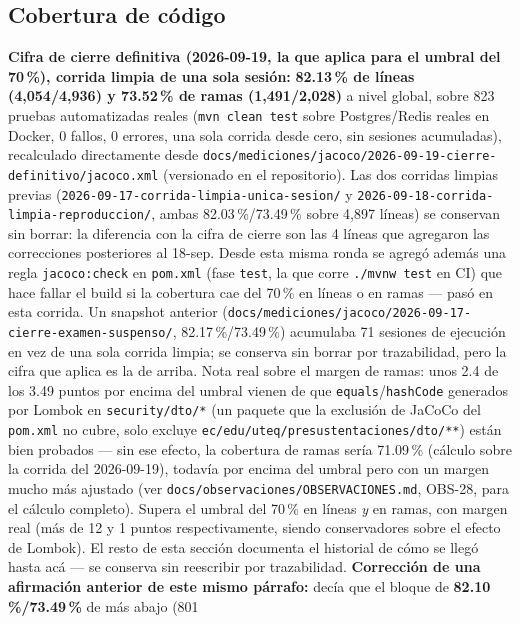 \subsection{Cobertura de código}

\textbf{Cifra de cierre definitiva (2026-09-19, la que aplica para el umbral del 70\,\%), corrida limpia
de una sola sesión:} \textbf{82.13\,\% de líneas (4,054/4,936) y 73.52\,\% de ramas (1,491/2,028)} a
nivel global, sobre 823 pruebas automatizadas reales (\texttt{mvn clean test} sobre Postgres/Redis reales
en Docker, 0 fallos, 0 errores, una sola corrida desde cero, sin sesiones acumuladas), recalculado
directamente desde
\texttt{docs/mediciones/jacoco/2026-09-19-cierre-definitivo/jacoco.xml} (versionado en el
repositorio). Las dos corridas limpias previas (\texttt{2026-09-17-corrida-limpia-unica-sesion/} y
\texttt{2026-09-18-corrida-limpia-reproduccion/}, ambas 82.03\,\%/73.49\,\% sobre 4,897 líneas) se
conservan sin borrar: la diferencia con la cifra de cierre son las 4 líneas que agregaron las
correcciones posteriores al 18-sep. Desde esta misma ronda se agregó además una regla \texttt{jacoco:check} en \texttt{pom.xml}
(fase \texttt{test}, la que corre \texttt{./mvnw test} en CI) que hace fallar el build si la cobertura
cae del 70\,\% en líneas o en ramas --- pasó en esta corrida. Un snapshot anterior
(\texttt{docs/mediciones/jacoco/2026-09-17-cierre-examen-suspenso/}, 82.17\,\%/73.49\,\%) acumulaba 71
sesiones de ejecución en vez de una sola corrida limpia; se conserva sin borrar por trazabilidad, pero la
cifra que aplica es la de arriba. Nota real sobre el margen de ramas: unos 2.4 de los 3.49 puntos por
encima del umbral vienen de que \texttt{equals}/\texttt{hashCode} generados por Lombok en
\texttt{security/dto/*} (un paquete que la exclusión de JaCoCo del \texttt{pom.xml} no cubre, solo
excluye \texttt{ec/edu/uteq/presustentaciones/dto/**}) están bien probados --- sin ese efecto, la
cobertura de ramas sería 71.09\,\% (cálculo sobre la corrida del 2026-09-19), todavía por encima del umbral pero con un margen mucho más ajustado
(ver \texttt{docs/observaciones/OBSERVACIONES.md}, OBS-28, para el cálculo completo). Supera el umbral
del 70\,\% en líneas \emph{y} en ramas, con margen real (más de 12 y 1 puntos respectivamente, siendo
conservadores sobre el efecto de Lombok). El resto de esta sección documenta el historial de cómo se
llegó hasta acá --- se conserva sin reescribir por trazabilidad. \textbf{Corrección de una afirmación
anterior de este mismo párrafo:} decía que el bloque de \textbf{82.10\,\%/73.49\,\%} de más abajo (801
